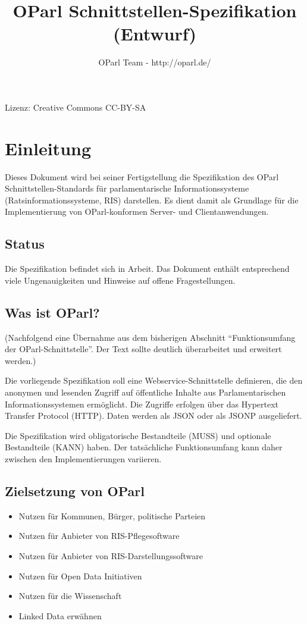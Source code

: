 \documentclass[,a4paper]{article}
\title{OParl Schnittstellen-Spezifikation (Entwurf)}
\author{OParl Team - http://oparl.de/}
\date{}
\begin{document}
\maketitle

Lizenz: Creative Commons CC-BY-SA

\section{Einleitung}

Dieses Dokument wird bei seiner Fertigstellung die Spezifikation des
OParl Schnittstellen-Standards für parlamentarische Informationssysteme
(Ratsinformationssysteme, RIS) darstellen. Es dient damit als Grundlage
für die Implementierung von OParl-konformen Server- und
Clientanwendungen.

\subsection{Status}

Die Spezifikation befindet sich in Arbeit. Das Dokument enthält
entsprechend viele Ungenauigkeiten und Hinweise auf offene
Fragestellungen.

\subsection{Was ist OParl?}

(Nachfolgend eine Übernahme aus dem bisherigen Abschnitt
``Funktionsumfang der OParl-Schnittstelle''. Der Text sollte deutlich
überarbeitet und erweitert werden.)

Die vorliegende Spezifikation soll eine Webservice-Schnittstelle
definieren, die den anonymen und lesenden Zugriff auf öffentliche
Inhalte aus Parlamentarischen Informationssystemen ermöglicht. Die
Zugriffe erfolgen über das Hypertext Transfer Protocol (HTTP). Daten
werden als JSON oder als JSONP ausgeliefert.

Die Spezifikation wird obligatorische Bestandteile (MUSS) und optionale
Bestandteile (KANN) haben. Der tatsächliche Funktionsumfang kann daher
zwischen den Implementierungen variieren.

\subsection{Zielsetzung von OParl}

\begin{itemize}
\item
  Nutzen für Kommunen, Bürger, politische Parteien
\item
  Nutzen für Anbieter von RIS-Pflegesoftware
\item
  Nutzen für Anbieter von RIS-Darstellungssoftware
\item
  Nutzen für Open Data Initiativen
\item
  Nutzen für die Wissenschaft
\item
  Linked Data erwähnen
\end{itemize}
\end{document}
